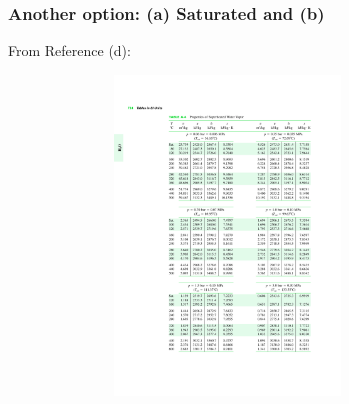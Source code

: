\documentclass[10pt,compress,unknownkeysallowed]{beamer}
\begin{document}
\begin{frame}
  \frametitle{Another option: (a) Saturated and (b) }
\scriptsize{From Reference (d):}\vspace{-.8cm}
   \begin{center}
   \begin{figure}
      \includegraphics[width=9.5cm,height=8.5cm,clip]{../Pics/Water_SuperheatedTable} 
   \end{figure}
   \end{center}
\end{frame}
\end{document}
